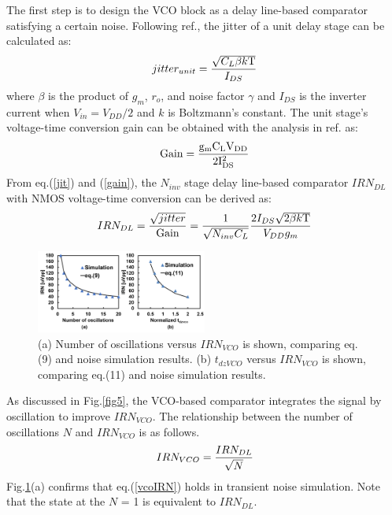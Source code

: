 \documentclass[journal]{IEEEtran}
\begin{document}
The first step is to design the VCO block as a delay line-based comparator satisfying a certain noise.
Following ref.\cite{timecomp}, the jitter of a unit delay stage can be calculated as:
\begin{eqnarray}
    \centering
    jitter_{unit} = \frac{\sqrt{C_L\beta k \rm{T}}}{I_{DS}}
    \label{jit}
\end{eqnarray}
where $\beta$ is the product of $g_m$, $r_o$, and noise factor $\gamma$ and $I_{DS}$ is the inverter current when $V_{in} = V_{DD}/2$ and $k$ is Boltzmann’s constant.
The unit stage's voltage-time conversion gain can be obtained with the analysis in ref.\cite{timecomp} as: 
\begin{eqnarray}
    \centering
    \rm{Gain} = \frac{g_mC_LV_{DD}}{2I_{DS}^2}
    \label{gain}
\end{eqnarray}
From eq.(\ref{jit}) and (\ref{gain}), the $N_{inv}$ stage delay line-based comparator $IRN_{DL}$ with NMOS voltage-time conversion can be derived as:
\begin{eqnarray}
    \centering
    IRN_{DL} = \frac{\sqrt{jitter}}{\rm{Gain}} = \frac{1}{\sqrt{N_{inv}C_L}}\frac{2I_{DS}\sqrt{2\beta k\rm{T}}}{V_{DD}g_m}
    \label{delaylineIRN}
\end{eqnarray}

\begin{figure}[!t]
\centering
 \includegraphics[width=0.5\textwidth]{figs/analysis.png}
  \caption{(a) Number of oscillations versus $IRN_{VCO}$ is shown, comparing eq.(9) and noise simulation results. (b) $t_{dzVCO}$ versus $IRN_{VCO}$ is shown, comparing eq.(11) and noise simulation results.}
  \label{nocnoise}
\end{figure}

As discussed in Fig.\ref{fig5}, the VCO-based comparator integrates the signal by oscillation to improve $IRN_{VCO}$.
The relationship between the number of oscillations $N$ and $IRN_{VCO}$ is as follows.
\begin{eqnarray}
    \centering
    IRN_{VCO} = \frac{IRN_{DL}}{\sqrt{N}}
    \label{vcoIRN}
\end{eqnarray}
Fig.\ref{nocnoise}(a) confirms that eq.(\ref{vcoIRN}) holds in transient noise simulation. Note that the state at the $N$ = 1 is equivalent to $IRN_{DL}$.
\end{document}
